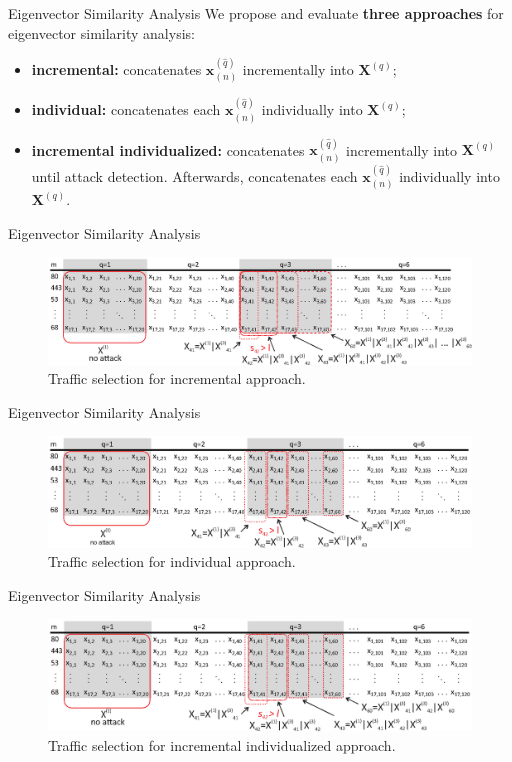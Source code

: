 \documentclass[newPxFont, numfooter, sectionpages]{beamer}
\begin{document}
\begin{frame}{Eigenvector Similarity Analysis}
	We propose and evaluate \textbf{three approaches} for eigenvector similarity analysis: 
	\begin{itemize}
		\item \textbf{incremental:} concatenates $\boldsymbol{x}^{(\hat{q})}_{(n)}$ incrementally into $\boldsymbol{X}^{(q)}$;
		\item \textbf{individual:} concatenates each $\boldsymbol{x}^{(\hat{q})}_{(n)}$ individually into $\boldsymbol{X}^{(q)}$;
		\item \textbf{incremental individualized:} concatenates $\boldsymbol{x}^{(\hat{q})}_{(n)}$ incrementally into $\boldsymbol{X}^{(q)}$ until attack detection. Afterwards, concatenates each $\boldsymbol{x}^{(\hat{q})}_{(n)}$ individually into $\boldsymbol{X}^{(q)}$.
	\end{itemize}
\end{frame}

\begin{frame}{Eigenvector Similarity Analysis}
	\begin{figure}[h!]
		\centering
	    \includegraphics[width=11.5cm]{figures/ch2/incremental.eps}
	    \caption{Traffic selection for incremental approach.}
	    \label{fig:2_fig8}
	\end{figure}
\end{frame}

\begin{frame}{Eigenvector Similarity Analysis}
	\begin{figure}[h!]
	     \includegraphics[width=11.5cm]{figures/ch2/individualized.eps}
	     \caption{Traffic selection for individual approach.}
	     \label{fig:2_fig9}
	\end{figure}
\end{frame}

\begin{frame}{Eigenvector Similarity Analysis}
	\begin{figure}[h!]
	     \includegraphics[width=11.5cm]{figures/ch2/incremental_individualized.eps}
	     \caption{Traffic selection for incremental individualized approach.}
	     \label{fig:2_fig2}
	\end{figure}
\end{frame}
\end{document}
